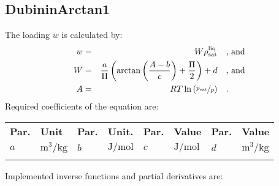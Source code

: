 \subsection{DubininArctan1}
\label{cha:approaches:ads:vol:darctan1}
%
The loading $w$ is calculated by: 
%
\begin{equation*}
	\begin{split}
		w &=& W \rho_\mathrm{sat}^{\mathrm{liq}} & \quad\text{, and} \\
		W &=& \frac{a}{\Pi} \left( \arctan \left( \frac{A - b}{c} \right) + \frac{\Pi}{2}\right) + d & \quad\text{, and} \\
		A &=& R T \ln \left( \nicefrac{p_\mathrm{sat}}{p} \right) & \quad\text{.} \\
	\end{split}
\end{equation*}
%
Required coefficients of the equation are:
%
\begin{longtable}[l]{ll|ll|ll|ll}
\toprule
\addlinespace
\textbf{Par.} & \textbf{Unit} & \textbf{Par.} &	\textbf{Unit.} & \textbf{Par.} & \textbf{Value}  & \textbf{Par.} & \textbf{Value} \\
\addlinespace
\midrule
\endhead

\bottomrule
\endfoot
\bottomrule
\endlastfoot
\addlinespace

$a$ & $\si{\cubic\meter\per\kilogram}$ & $b$ & $\si{\joule\per\mole}$ & $c$ & $\si{\joule\per\mole}$ & $d$ & $\si{\cubic\meter\per\kilogram}$ \\

\addlinespace
\end{longtable}
%
Implemented inverse functions and partial derivatives are:
%
